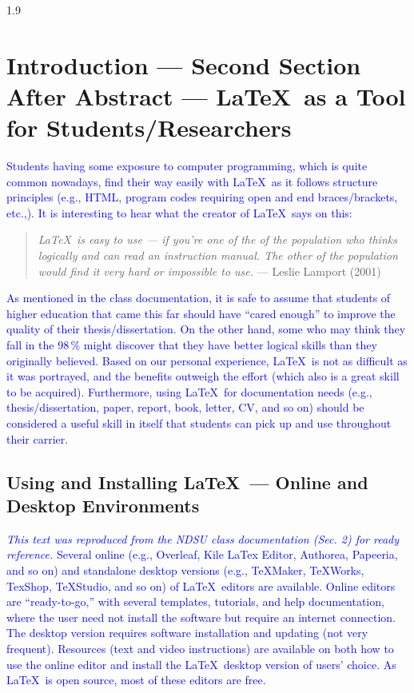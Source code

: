 \documentclass[phd]{ndsu-thesis-2022}
\newcommand\myspacing{1.9} %
\newcommand\italk[1]{\textcolor{blue}{#1}}  %
\begin{document}
\begin{spacing}{\myspacing}
\vspace{-5ex}
\section{Introduction --- Second Section After Abstract --- \LaTeX\ as a Tool for Students/Researchers}
\italk{Students having some exposure to computer programming, which is quite common nowadays, find their way easily with \LaTeX\ as it follows structure principles (e.g., HTML, program codes requiring open and end braces/brackets, etc.,). It is interesting to hear what the creator of \LaTeX\ says on this:} 
\textcolor{magenta}{
\begin{quote}
\singlespacing
\raggedright
\textit{
\LaTeX\ is easy to use --- if you're one of the  of the population who thinks logically and can read an instruction manual. The other  of the population would find it very hard or impossible to use.} 
\hfill --- Leslie Lamport (2001)
\end{quote}
}

\italk{As mentioned in the class documentation, it is safe to assume that students of higher education that came this far should have ``cared enough'' to improve the quality of their thesis/dissertation. On the other hand, some who may think they fall in the 98\,\% might discover that they have better logical skills than they originally believed. Based on our personal experience, \LaTeX\ is not as difficult as it was portrayed, and the benefits outweigh the effort (which also is a great skill to be acquired). Furthermore, using \LaTeX\ for documentation needs (e.g., thesis/dissertation, paper, report, book, letter, CV, and so on) should be considered a useful skill in itself that students can pick up and use throughout their carrier. 
} 

\subsection{Using and Installing \LaTeX\  --- Online and Desktop Environments}  
\italk{\emph{This text was reproduced from the NDSU class documentation (Sec. 2) for ready reference.} Several online (e.g., Overleaf, Kile LaTex Editor, Authorea, Papeeria, and so on) and standalone desktop versions (e.g., TeXMaker, TeXWorks, TexShop, TeXStudio, and so on) of \LaTeX\ editors are available. Online editors are ``ready-to-go,'' with several templates, tutorials, and help documentation, where the user need not install the software but require an internet connection. The desktop version requires software installation and updating (not very frequent). Resources (text and video instructions) are available on both how to use the online editor and install the \LaTeX\ desktop version of users' choice. As \LaTeX\ is open source, most of these editors are free.}


\end{spacing}
\end{document}
